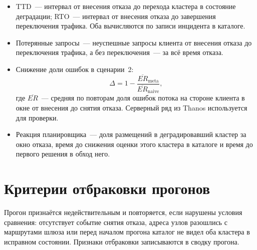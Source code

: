 \begin{itemize}
  \item TTD~--- интервал от внесения отказа до перехода кластера в состояние
        деградации; RTO~--- интервал от внесения отказа до завершения
        переключения трафика. Оба вычисляются по записи инцидента в каталоге.
  \item Потерянные запросы~--- неуспешные запросы клиента от внесения отказа
        до переключения трафика, а без переключения~--- за всё время отказа.
  \item Снижение доли ошибок в сценарии~2:
        \[
          \Delta = 1 - \frac{\overline{ER}_{\mathrm{meta}}}{\overline{ER}_{\mathrm{naive}}},
        \]
        где $\overline{ER}$~--- средняя по повторам доля ошибок потока на
        стороне клиента в окне от внесения до снятия отказа. Серверный ряд
        из Thanos используется для проверки.
  \item Реакция планировщика~--- доля размещений в деградировавший кластер
        за окно отказа, время до снижения оценки этого кластера в каталоге и
        время до первого решения в обход него.
\end{itemize}

\section{Критерии отбраковки прогонов}

Прогон признаётся недействительным и повторяется, если нарушены условия
сравнения: отсутствует событие снятия отказа, адреса узлов разошлись с
маршрутами шлюза или перед началом прогона каталог не видел оба кластера
в исправном состоянии. Признаки отбраковки записываются в сводку прогона.
